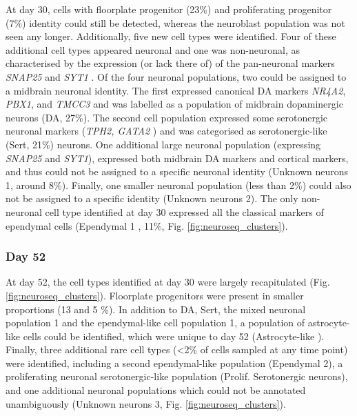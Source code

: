 At day 30, cells with floorplate progenitor (23\%) and proliferating progenitor (7\%) identity could still be detected, whereas the neuroblast population was not seen any longer.
Additionally, five new cell types were identified.
Four of these additional cell types appeared neuronal and one was non-neuronal, as characterised by the expression (or lack there of) of the pan-neuronal markers \textit{SNAP25} and \textit{SYT1} \cite{arenas2015make}.
Of the four neuronal populations, two could be assigned to a midbrain neuronal identity.
The first expressed canonical DA markers \textit{NR4A2}, \textit{PBX1}, and \textit{TMCC3} \cite{la2016molecular, park2006acquisition, ramonet2012park9} and was labelled as a population of midbrain dopaminergic neurons (DA, 27\%).
The second cell population expressed some serotonergic neuronal markers (\textit{TPH2, GATA2} \cite{cummings2019serotonergic}) and was categorised as serotonergic-like (Sert, 21\%) neurons. 
One additional large neuronal population (expressing \textit{SNAP25} and \textit{SYT1}), expressed both midbrain DA markers and cortical markers, and thus could not be assigned to a specific neuronal identity (Unknown neurons 1, around 8\%).
Finally, one smaller neuronal population (less than 2\%) could also not be assigned to a specific identity (Unknown neurons 2). 
The only non-neuronal cell type identified at day 30 expressed all the classical markers of ependymal cells (Ependymal 1 \cite{campbell2017molecular}, 11\%, Fig. \ref{fig:neuroseq_clusters}). 

\subsubsection{Day 52}

At day 52, the cell types identified at day 30 were largely recapitulated (Fig. \ref{fig:neuroseq_clusters}).
Floorplate progenitors were present in smaller proportions (13 and 5 \%).
In addition to DA, Sert, the mixed neuronal population 1 and the ependymal-like cell population 1, a population of astrocyte-like cells could be identified, which were unique to day 52 (Astrocyte-like \cite{sloan2017human, zhang2016purification}). 
Finally, three additional rare cell types (<2\% of cells sampled at any time point) were identified, including a second ependymal-like population (Ependymal 2), a proliferating neuronal serotonergic-like population (Prolif. Serotonergic neurons), and one additional neuronal populations which could not be annotated unambiguously (Unknown neurons 3, Fig. \ref{fig:neuroseq_clusters}). \\

